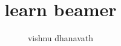 \documentclass[12pt]{beamer}
\author{vishnu dhanavath}
\title{learn beamer}
\institute{rgukt, basar}
\begin{document}
\begin{frame}
\titlepage
\end{frame}

\begin{frame}
\tableofcontents
\end{frame}

\begin{frame}{}

\end{frame}
\end{document}

